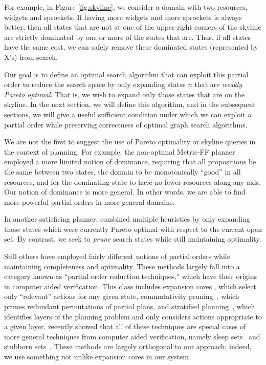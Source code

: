 \documentclass[letterpaper]{article}
\theoremstyle{plain} \newtheorem{theorem}{Theorem} \newtheorem{proposition}{Proposition} \newtheorem{lemma}{Lemma}
\theoremstyle{definition} \newtheorem{definition}{Definition} \newtheorem{conjecture}{Conjecture} \newtheorem*{example}{Example}
\theoremstyle{remark} \newtheorem*{remark}{Remark} \newtheorem*{note}{Note} \newtheorem{case}{Case}
\begin{document}
For example, in Figure \ref{fig:skyline}, we consider a domain with
two resources, widgets and sprockets. If having more widgets and
more sprockets is always better, then all states that are not at one
of the upper-right corners of the skyline are strictly dominated by one or more
of the states that are.  Thus, if all states have the same cost,
we can safely remove these dominated states (represented by X's) from search.

Our goal is to define an optimal search algorithm that can exploit
this partial order to reduce the search space by only expanding
states $n$ that are \textit{weakly Pareto optimal}. That is, we
wish to expand only those states that are on the skyline. In the
next section, we will define this algorithm, and in the subsequent
sections, we will give a useful sufficient condition under which
we can exploit a partial order while preserving correctness of
optimal graph search algorithms.

We are not the first to suggest the use of Pareto optimality or
skyline queries in the context of planning. For example, the
non-optimal Metric-FF planner~\citep{hoffmann2003metric} employed
a more limited notion of dominance, requiring that all propositions
be the same between two states, the domain to be monotonically
``good'' in all resources, and for the dominating state to have no
fewer resources along any axis. Our notion of dominance is more
general. In other words, we are able to find more powerful partial
orders in more general domains.

In another satisficing planner, \citet{roger2010more} combined
multiple heuristics by only expanding those states which were
currently Pareto optimal with respect to the current open set.  By
contrast, we seek to \textit{prune} search states while still
maintaining optimality.

Still others have employed fairly different notions of partial
orders while maintaining completeness and optimality. These methods
largely fall into a category known as ``partial order reduction
techniques,'' which have their origins in computer aided verification.
This class includes expansion cores \citep{chen09completeness,
xu11theory}, which select only ``relevant'' actions for any given
state, commutativity pruning~\citep{geffner2000admissible}, which
prunes redundant permutations of partial plans, and stratified
planning~\citep{chen2009stratified}, which identifies layers of the
planning problem and only considers actions appropriate to a given
layer. \citet{wehrle2012partial} recently showed that all of these
techniques are special cases of more general techniques from computer
aided verification, namely sleep sets~\citep{godefroid96partial}
and stubborn sets~\citep{valmari92stubborn}. These methods are
largely orthogonal to our approach; indeed, we use something not
unlike expansion cores in our system.
\end{document}
